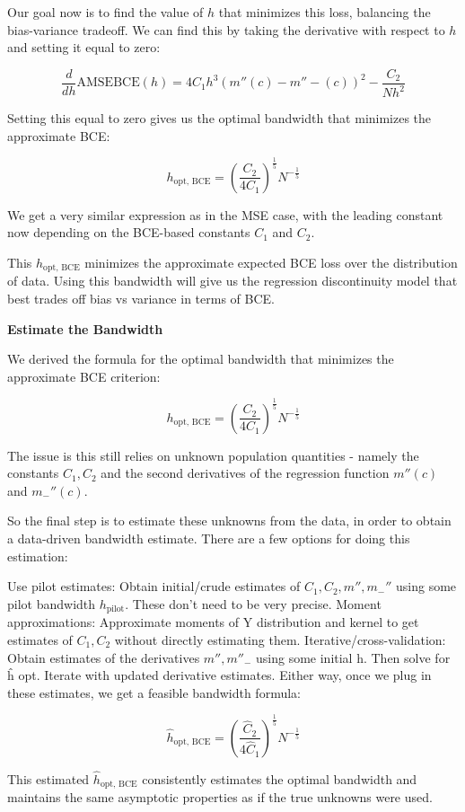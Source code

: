 Our goal now is to find the value of $h$ that minimizes this loss, balancing the bias-variance tradeoff. We can find this by taking the derivative with respect to $h$ and setting it equal to zero:

$$\frac{d}{dh}\text{AMSE}\text{BCE}(h) = 4C_1h^3(m''(c)-m''-(c))^2 - \frac{C_2}{Nh^2}$$

Setting this equal to zero gives us the optimal bandwidth that minimizes the approximate BCE:

$$h_\text{opt, BCE} = \left(\frac{C_2}{4C_1}\right)^{\frac{1}{5}} N^{-\frac{1}{5}}$$

We get a very similar expression as in the MSE case, with the leading constant now depending on the BCE-based constants $C_1$ and $C_2$.

This $h_\text{opt, BCE}$ minimizes the approximate expected BCE loss over the distribution of data. Using this bandwidth will give us the regression discontinuity model that best trades off bias vs variance in terms of BCE.

\textbf{Estimate the Bandwidth}

We derived the formula for the optimal bandwidth that minimizes the approximate BCE criterion:

$$h_\text{opt, BCE} = \left(\frac{C_2}{4C_1}\right)^{\frac{1}{5}} N^{-\frac{1}{5}}$$

The issue is this still relies on unknown population quantities - namely the constants $C_1, C_2$ and the second derivatives of the regression function $m''(c)$ and $m_-''(c)$.

So the final step is to estimate these unknowns from the data, in order to obtain a data-driven bandwidth estimate. There are a few options for doing this estimation:

Use pilot estimates: Obtain initial/crude estimates of $C_1, C_2, m'', m_-''$ using some pilot bandwidth $h_\text{pilot}$. These don't need to be very precise.
Moment approximations: Approximate moments of Y distribution and kernel to get estimates of $C_1, C_2$ without directly estimating them.
Iterative/cross-validation: Obtain estimates of the derivatives $m'',m''_-$ using some initial h. Then solve for ĥ opt. Iterate with updated derivative estimates.
Either way, once we plug in these estimates, we get a feasible bandwidth formula:

$$\hat{h}_\text{opt, BCE} = \left(\frac{\hat{C}_2}{4\hat{C}_1}\right)^{\frac{1}{5}} N^{-\frac{1}{5}}$$

This estimated $\hat{h}_\text{opt, BCE}$ consistently estimates the optimal bandwidth and maintains the same asymptotic properties as if the true unknowns were used.
